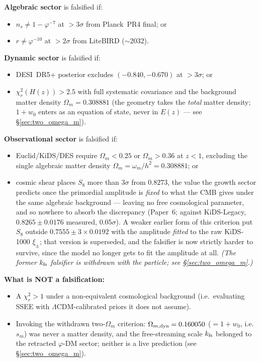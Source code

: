 \documentclass[12pt,a4paper]{article}
\begin{document}
\medskip
\noindent\begin{tcolorbox}[colback=red!4,colframe=red!60!black,title=SSEE Falsification Criteria,width=\linewidth]
\textbf{Algebraic sector} is falsified if:
\begin{itemize}[nosep,leftmargin=*]
  \item $n_s \neq 1-\varphi^{-7}$ at $>3\sigma$ from Planck~PR4 final; or
  \item $r \neq \varphi^{-10}$ at $>2\sigma$ from LiteBIRD ($\sim$2032).
\end{itemize}
\textbf{Dynamic sector} is falsified if:
\begin{itemize}[nosep,leftmargin=*]
  \item DESI~DR5+ posterior excludes $(-0.840,-0.670)$ at $>3\sigma$; or
  \item $\chi^2_r(H(z)) > 2.5$ with full systematic covariance and the
        background matter density $\Omega_m=0.308881$ (the geometry takes the
        \emph{total} matter density; $1+w_0$ enters as an equation of state,
        never in $E(z)$ --- see \S\ref{sec:two_omega_m}).
\end{itemize}
\textbf{Observational sector} is falsified if:
\begin{itemize}[nosep,leftmargin=*]
  \item Euclid/KiDS/DES require $\Omega_m<0.25$ or $\Omega_m>0.36$ at $z<1$,
        excluding the single algebraic matter density
        $\Omega_m=\omega_m/h^2=0.308881$; or
  \item cosmic shear places $S_8$ more than $3\sigma$ from $0.8273$, the value
        the growth sector predicts once the primordial amplitude is \emph{fixed}
        to what the CMB gives under the same algebraic background --- leaving no
        free cosmological parameter, and so nowhere to absorb the discrepancy
        (Paper~6; against KiDS-Legacy, $0.8265\pm0.0176$ measured, $0.05\sigma$).
        A weaker earlier form of this criterion put $S_8$ outside
        $0.7555\pm3\times0.0192$ with the amplitude \emph{fitted} to the raw
        KiDS-1000 $\xi_\pm$; that version is superseded, and the falsifier is
        now strictly harder to survive, since the model no longer gets to fit
        the amplitude at all.
        \emph{(The former $k_{\rm fs}$ falsifier is withdrawn with the particle;
        see \S\ref{sec:two_omega_m}.)}
\end{itemize}
\textbf{What is NOT a falsification:}
\begin{itemize}[nosep,leftmargin=*]
  \item A $\chi^2_r > 1$ under a non-equivalent cosmological background
        (i.e.\ evaluating SSEE with $\Lambda$CDM-calibrated priors it does not assume).
  \item Invoking the withdrawn two-$\Omega_m$ criterion: $\Omega_{m,\rm dyn}=0.160050$
        ($=1+w_0$, i.e.\ $s_m$) was never a matter density, and the free-streaming
        scale $k_{\rm fs}$ belonged to the retracted $\varphi$-DM sector; neither is
        a live prediction (see \S\ref{sec:two_omega_m}).
\end{itemize}
\end{tcolorbox}
\end{document}
